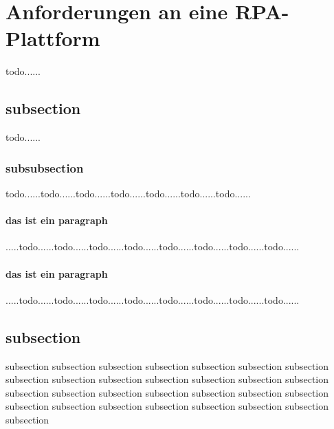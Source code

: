 \section{Anforderungen an eine RPA-Plattform}

todo......

\subsection{subsection}

todo......

\subsubsection{subsubsection}
\label{sec:subsectionlabelforreference}
todo......todo......todo......todo......todo......todo......todo......

\paragraph{das ist ein paragraph}
.....todo......todo......todo......todo......todo......todo......todo......todo......

\paragraph{das ist ein paragraph}
.....todo......todo......todo......todo......todo......todo......todo......todo......



\subsection{subsection}
\label{sub:subsection}

subsection subsection subsection subsection subsection subsection subsection subsection subsection subsection subsection subsection subsection subsection subsection subsection subsection subsection subsection subsection subsection subsection subsection subsection subsection subsection subsection subsection subsection